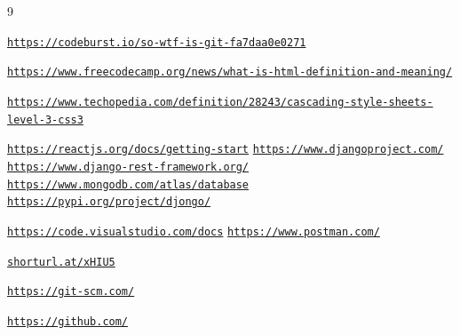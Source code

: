 \pagestyle{fancy}
\fancyhf{}
\lhead{\textsl{\footnotesize{\nouppercase{}}}}
\cfoot{\thepage}
\rfoot{\textsl{\footnotesize }}
\normalsize
\begin{thebibliography}{9}

\texttt{\url{https://codeburst.io/so-wtf-is-git-fa7daa0e0271}}

\texttt{\url{https://www.freecodecamp.org/news/what-is-html-definition-and-meaning/}}

\texttt{\url{https://www.techopedia.com/definition/28243/cascading-style-sheets-level-3-css3}}


\texttt{\url{https://reactjs.org/docs/getting-start}}
\texttt{\url{https://www.djangoproject.com/}}
\texttt{ \url{https://www.django-rest-framework.org/}}
\texttt{\url{https://www.mongodb.com/atlas/database}}
\texttt{\url{https://pypi.org/project/djongo/}}

\texttt{\url{https://code.visualstudio.com/docs}}
\texttt{\url{https://www.postman.com/}}

\texttt{\url{shorturl.at/xHIU5}}

\texttt{\url{https://git-scm.com/}}

\texttt{\url{https://github.com/}}




\end{thebibliography}
\newpage
\pagestyle{fancy}
\fancyhf{}
\lhead{\textsl{\footnotesize{\nouppercase{\rightmark}}}}
\rhead{\textsl{\footnotesize{\nouppercase{\leftmark}}}}
\cfoot{\thepage}
\rfoot{\textsl{\footnotesize }}

